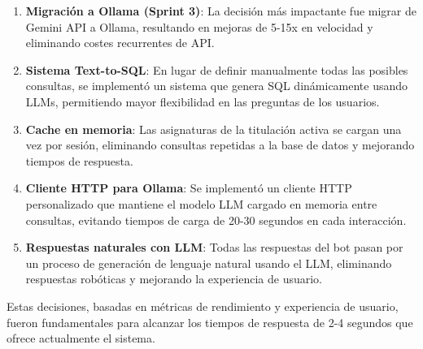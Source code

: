 \begin{enumerate}
    \item \textbf{Migración a Ollama (Sprint 3)}: La decisión más impactante fue migrar de Gemini API a Ollama, resultando en mejoras de 5-15x en velocidad y eliminando costes recurrentes de API.

    \item \textbf{Sistema Text-to-SQL}: En lugar de definir manualmente todas las posibles consultas, se implementó un sistema que genera SQL dinámicamente usando LLMs, permitiendo mayor flexibilidad en las preguntas de los usuarios.

    \item \textbf{Cache en memoria}: Las asignaturas de la titulación activa se cargan una vez por sesión, eliminando consultas repetidas a la base de datos y mejorando tiempos de respuesta.

    \item \textbf{Cliente HTTP para Ollama}: Se implementó un cliente HTTP personalizado que mantiene el modelo LLM cargado en memoria entre consultas, evitando tiempos de carga de 20-30 segundos en cada interacción.

    \item \textbf{Respuestas naturales con LLM}: Todas las respuestas del bot pasan por un proceso de generación de lenguaje natural usando el LLM, eliminando respuestas robóticas y mejorando la experiencia de usuario.
\end{enumerate}

Estas decisiones, basadas en métricas de rendimiento y experiencia de usuario, fueron fundamentales para alcanzar los tiempos de respuesta de 2-4 segundos que ofrece actualmente el sistema.
